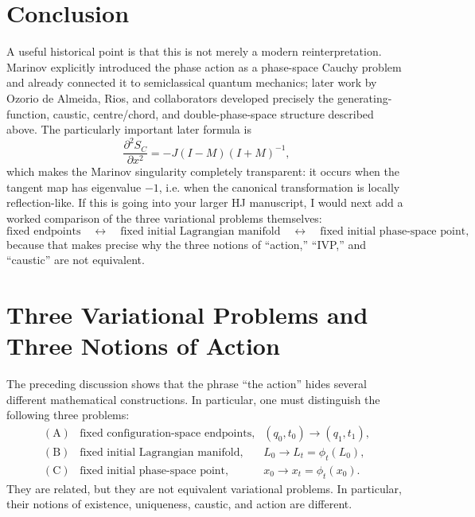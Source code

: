 \section{Conclusion}
A useful historical point is that this is not merely a modern reinterpretation.
Marinov explicitly introduced the phase action as a phase-space Cauchy problem
and already connected it to semiclassical quantum mechanics; later work by
Ozorio de Almeida, Rios, and collaborators developed precisely the
generating-function, caustic, centre/chord, and double-phase-space structure
described above.
The particularly important later formula is
$$ \frac{\partial^2 S_C}{\partial x^2} =-J(I-M)(I+M)^{-1}, $$
which makes the Marinov singularity completely transparent: it occurs when the
tangent map has eigenvalue \(-1\), i.e. when the canonical transformation is
locally reflection-like.
If this is going into your larger HJ manuscript, I would next add a worked comparison of the three variational problems themselves:
$$ \boxed{ \text{fixed endpoints} \quad\leftrightarrow\quad \text{fixed initial Lagrangian manifold} \quad\leftrightarrow\quad \text{fixed initial phase-space point}, } $$
because that makes precise why the three notions of “action,” “IVP,” and “caustic” are not equivalent.
\section{Three Variational Problems and Three Notions of Action}
The preceding discussion shows that the phrase ``the action'' hides several
different mathematical constructions.  In particular, one must distinguish
the following three problems:
\begin{equation}
\boxed{
\begin{array}{lll}
\mathrm{(A)} & \text{fixed configuration-space endpoints},
&(q_0,t_0)\longrightarrow(q_1,t_1),\\[1mm]
\mathrm{(B)} & \text{fixed initial Lagrangian manifold},
&L_0\longrightarrow L_t=\phi_t(L_0),\\[1mm]
\mathrm{(C)} & \text{fixed initial phase-space point},
&x_0\longrightarrow x_t=\phi_t(x_0).
\end{array}}
\end{equation}
They are related, but they are not equivalent variational problems.  In
particular, their notions of existence, uniqueness, caustic, and action are
different.
